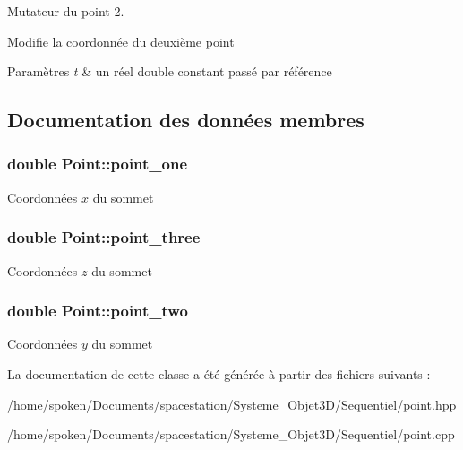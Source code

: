 Mutateur du point 2. 

Modifie la coordonnée du deuxième point 
\begin{DoxyParams}{Paramètres}
{\em t} & un réel double constant passé par référence \\
\hline
\end{DoxyParams}


\subsection{Documentation des données membres}
\hypertarget{class_point_a030522c3949dc71bc4c1f39eb1b0c77e}{
\subsubsection[{point\-\_\-one}]{\setlength{\rightskip}{0pt plus 5cm}double Point\-::point\-\_\-one\hspace{0.3cm}{\ttfamily [private]}}}\label{class_point_a030522c3949dc71bc4c1f39eb1b0c77e}
Coordonnées $ x$ du sommet \hypertarget{class_point_af7cb3c4c0c0f52218ac9ce180df003da}{
\subsubsection[{point\-\_\-three}]{\setlength{\rightskip}{0pt plus 5cm}double Point\-::point\-\_\-three\hspace{0.3cm}{\ttfamily [private]}}}\label{class_point_af7cb3c4c0c0f52218ac9ce180df003da}
Coordonnées $ z$ du sommet \hypertarget{class_point_a7eece7f7413a741137cf32bb763f3987}{
\subsubsection[{point\-\_\-two}]{\setlength{\rightskip}{0pt plus 5cm}double Point\-::point\-\_\-two\hspace{0.3cm}{\ttfamily [private]}}}\label{class_point_a7eece7f7413a741137cf32bb763f3987}
Coordonnées $ y$ du sommet 

La documentation de cette classe a été générée à partir des fichiers suivants \-:\begin{DoxyCompactItemize}
\item 
/home/spoken/\-Documents/spacestation/\-Systeme\-\_\-\-Objet3\-D/\-Sequentiel/point.\-hpp\item 
/home/spoken/\-Documents/spacestation/\-Systeme\-\_\-\-Objet3\-D/\-Sequentiel/point.\-cpp\end{DoxyCompactItemize}
